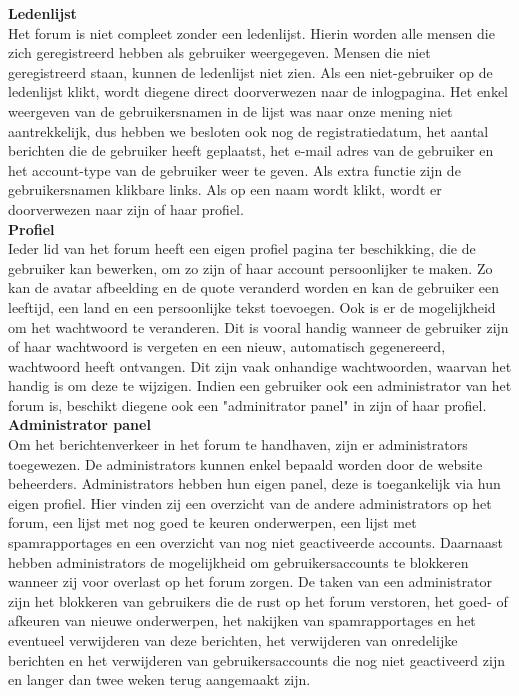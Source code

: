 \documentclass[a4paper,12pt]{article}
\begin{document}
{\bfseries Ledenlijst}\\
Het forum is niet compleet zonder een ledenlijst. Hierin worden alle mensen die zich geregistreerd hebben als gebruiker weergegeven. Mensen die niet geregistreerd staan, kunnen de ledenlijst niet zien. Als een niet-gebruiker op de ledenlijst klikt, wordt diegene direct doorverwezen naar de inlogpagina. Het enkel weergeven van de gebruikersnamen in de lijst was naar onze mening niet aantrekkelijk, dus hebben we besloten ook nog de registratiedatum, het aantal berichten die de gebruiker heeft geplaatst, het e-mail adres van de gebruiker en het account-type van de gebruiker weer te geven. Als extra functie zijn de gebruikersnamen klikbare links. Als op een naam wordt klikt, wordt er doorverwezen naar zijn of haar profiel. \\

 
{\bfseries Profiel}\\
Ieder lid van het forum heeft een eigen profiel pagina ter beschikking, die de gebruiker kan bewerken, om zo zijn of haar account persoonlijker te maken. Zo kan de avatar afbeelding en de quote veranderd worden en kan de gebruiker een leeftijd, een land en een persoonlijke tekst toevoegen. Ook is er de mogelijkheid om het wachtwoord te veranderen. Dit is vooral handig wanneer de gebruiker zijn of haar wachtwoord is vergeten en een nieuw, automatisch gegenereerd, wachtwoord heeft ontvangen. Dit zijn vaak onhandige wachtwoorden, waarvan het handig is om deze te wijzigen. Indien een gebruiker ook een administrator van het forum is, beschikt diegene ook een "adminitrator panel" in zijn of haar profiel. \\


{\bfseries Administrator panel}\\
Om het berichtenverkeer in het forum te handhaven, zijn er administrators toegewezen. De administrators kunnen enkel bepaald worden door de website beheerders. Administrators hebben hun eigen panel, deze is toegankelijk via hun eigen profiel. Hier vinden zij een overzicht van de andere administrators op het forum, een lijst met nog goed te keuren onderwerpen, een lijst met spamrapportages en een overzicht van nog niet geactiveerde accounts. Daarnaast hebben administrators de mogelijkheid om gebruikersaccounts te blokkeren wanneer zij voor overlast op het forum zorgen. De taken van een administrator zijn het blokkeren van gebruikers die de rust op het forum verstoren, het goed- of afkeuren van nieuwe onderwerpen, het nakijken van spamrapportages en het eventueel verwijderen van deze berichten, het verwijderen van onredelijke berichten en het verwijderen van gebruikersaccounts die nog niet geactiveerd zijn en langer dan twee weken terug aangemaakt zijn. \\
\end{document}
